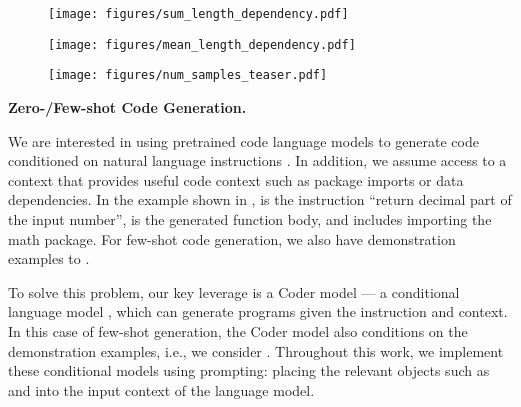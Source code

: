 \documentclass[nohyperref]{article}
\theoremstyle{plain}
\theoremstyle{definition}
\theoremstyle{remark}
\renewcommand{\paragraph}[1]{
     \textbf{#1} 
 }
\begin{document}
\begin{figure*}[t]
     \centering
     \begin{subfigure}[b]{0.32\textwidth}
         \centering
         \texttt{[image: figures/sum\_length\_dependency.pdf]}
         \caption{}
         \label{fig:sum_len}
     \end{subfigure}
     \hfill
     \begin{subfigure}[b]{0.32\textwidth}
         \centering
         \texttt{[image: figures/mean\_length\_dependency.pdf]}
         \caption{}
         \label{fig:mean_len}
     \end{subfigure}
     \hfill
     \begin{subfigure}[b]{0.32\textwidth}
         \centering
         \texttt{[image: figures/num\_samples\_teaser.pdf]}
         \caption{}
         \label{fig:num_samples_teaser}
     \end{subfigure}
     \vspace{-10pt}
     \caption{\ref{fig:sum_len} and \ref{fig:mean_len} show that the Coder model  has a strong dependence on the length of generated code and length normalization can introduce additional biases. \ref{fig:num_samples_teaser} shows that in practice, Coder-only reranking (Coder) and normalized Coder-only reranking (N. Coder) have worse performance when the number of samples becomes large, which can be caused by selecting degenerate solutions.}
     \vspace{-15pt}
\end{figure*}

\paragraph{Zero-/Few-shot Code Generation.}
We are interested in using pretrained code language models to generate code  conditioned on natural language instructions .
In addition, we assume access to a context  that provides useful code context such as package imports or data dependencies.
In the example shown in ,  is the instruction ``return decimal part of the input number'',  is the generated function body, and  includes importing the math package.
For few-shot code generation, we also have  demonstration examples  to .

To solve this problem, our key leverage is a Coder model --- a conditional language model , which can generate programs given the instruction and context.
In this case of few-shot generation, the Coder model also conditions on the demonstration examples, i.e., we consider .
Throughout this work, we implement these conditional models using prompting: placing the relevant objects such as  and  into the input context of the language model.
\end{document}

